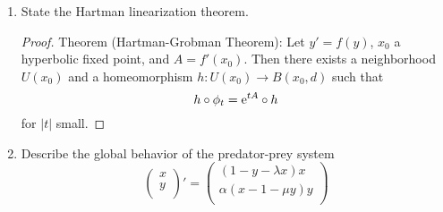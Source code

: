 \documentclass[../psets.tex]{subfiles}
\begin{document}
\begin{enumerate}
\begin{proof}
        Working with the other one, we expand and combine all $\e[at]$ terms for $a>0$ and all $\e[bt]$ terms for all $b<0$.
        \begin{align*}
            x(t) &= z\e[-t]+w\sinh(t)+w^2(\e[2t]-\e[-t])\\
            &= z\e[-t]+w\cdot\frac{\e[t]-\e[-t]}{2}+w^2\e[2t]-w^2\e[-t]\\
            &= z\e[-t]+\frac{w}{2}\e[t]-\frac{w}{2}\e[-t]+w^2\e[2t]-w^2\e[-t]\\
            &= \left[ w^2\e[2t]+\frac{w}{2}\e[t] \right]+\left[ z-\frac{w}{2}-w^2 \right]\e[-t]
        \end{align*}
        The left term above will clearly converge to 0 as $t\to -\infty$.
        However, the right term will diverge to $\infty$ as $t\to -\infty$ unless $z-w/2-w^2=0$, so we take this to be our condition.
        Indeed, this implies that $z=w/2+w^2$ is a constraint on $z$, but $w$ can still take on any value, so our solution is
        \begin{equation*}
            W_u(0) = \left\{ \left( \frac{y}{2}+y^2,y \right) \,\middle|\, y\in\R \right\}
        \end{equation*}
        as desired.
    \end{proof}
    \item State the Hartman linearization theorem.
    \begin{proof}
        Theorem (Hartman-Grobman Theorem): Let $y'=f(y)$, $x_0$ a hyperbolic fixed point, and $A=f'(x_0)$. Then there exists a neighborhood $U(x_0)$ and a homeomorphism $h:U(x_0)\to B(x_0,d)$ such that
        \begin{equation*}
            h\circ\phi_t = \e[tA]\circ h
        \end{equation*}
        for $|t|$ small.
    \end{proof}
    \item Describe the global behavior of the predator-prey system
    \begin{equation*}
        \begin{pmatrix}
            x\\
            y\\
        \end{pmatrix}'
        =
        \begin{pmatrix}
            (1-y-\lambda x)x\\
            \alpha(x-1-\mu y)y\\
        \end{pmatrix}

\end{equation*}
\end{enumerate}
\end{document}
